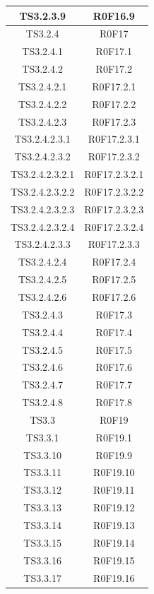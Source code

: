 \documentclass[../PianoDiQualifica.tex]{subfiles}
\begin{document}
\begin{longtable}{|c|c|}
		\hline
		TS3.2.3.9 & R0F16.9   \\
		\hline
		TS3.2.4 & R0F17   \\
		\hline
		TS3.2.4.1 & R0F17.1   \\
		\hline
		TS3.2.4.2 & R0F17.2   \\
		\hline
		TS3.2.4.2.1 & R0F17.2.1   \\
		\hline
		TS3.2.4.2.2 & R0F17.2.2   \\
		\hline
		TS3.2.4.2.3 & R0F17.2.3   \\
		\hline
		TS3.2.4.2.3.1 & R0F17.2.3.1   \\
		\hline
		TS3.2.4.2.3.2 & R0F17.2.3.2   \\
		\hline
		TS3.2.4.2.3.2.1 & R0F17.2.3.2.1   \\
		\hline
		TS3.2.4.2.3.2.2 & R0F17.2.3.2.2   \\
		\hline
		TS3.2.4.2.3.2.3 & R0F17.2.3.2.3   \\
		\hline
		TS3.2.4.2.3.2.4 & R0F17.2.3.2.4   \\
		\hline
		TS3.2.4.2.3.3 & R0F17.2.3.3   \\
		\hline
		TS3.2.4.2.4 & R0F17.2.4   \\
		\hline
		TS3.2.4.2.5 & R0F17.2.5   \\
		\hline
		TS3.2.4.2.6 & R0F17.2.6   \\
		\hline
		TS3.2.4.3 & R0F17.3   \\
		\hline
		TS3.2.4.4 & R0F17.4   \\
		\hline
		TS3.2.4.5 & R0F17.5   \\
		\hline
		TS3.2.4.6 & R0F17.6   \\
		\hline
		TS3.2.4.7 & R0F17.7   \\
		\hline
		TS3.2.4.8 & R0F17.8   \\
		\hline
		TS3.3 & R0F19   \\
		\hline
		TS3.3.1 & R0F19.1   \\
		\hline
		TS3.3.10 & R0F19.9   \\
		\hline
		TS3.3.11 & R0F19.10   \\
		\hline
		TS3.3.12 & R0F19.11   \\
		\hline
		TS3.3.13 & R0F19.12   \\
		\hline
		TS3.3.14 & R0F19.13   \\
		\hline
		TS3.3.15 & R0F19.14   \\
		\hline
		TS3.3.16 & R0F19.15   \\
		\hline
		TS3.3.17 & R0F19.16   \\
		\hline

\end{longtable}
\end{document}
